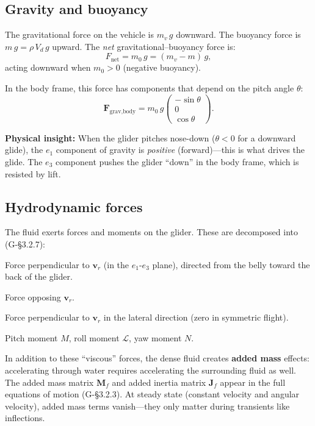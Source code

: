 \documentclass[11pt,a4paper]{article}
\newcommand{\vect}[1]{\bm{#1}}
\newcommand{\mat}[1]{\mathbf{#1}}
\newcommand{\insight}[1]{\par\smallskip\noindent\colorbox{green!8}{\parbox{\dimexpr\linewidth-2\fboxsep}{%
  \small\textbf{Physical insight:} #1}}\smallskip}
\begin{document}
\subsection{Gravity and buoyancy}

The gravitational force on the vehicle is $m_v\,g$ downward.  The buoyancy force is
$m\,g = \rho\,V_d\,g$ upward.  The \emph{net} gravitational--buoyancy force is:
\begin{equation}
  F_\text{net} = m_0\,g = (m_v - m)\,g,
  \label{eq:Fnet}
\end{equation}
acting downward when $m_0>0$ (negative buoyancy).

In the body frame, this force has components that depend on the pitch angle $\theta$:
\begin{equation}
  \vect{F}_\text{grav,body} = m_0\,g\begin{pmatrix} -\sin\theta \\ 0 \\ \cos\theta \end{pmatrix}.
  \label{eq:Fgrav_body}
\end{equation}

\insight{When the glider pitches nose-down ($\theta<0$ for a downward glide), the
$e_1$ component of gravity is \emph{positive} (forward)---this is what drives the glide.
The $e_3$ component pushes the glider ``down'' in the body frame, which is resisted by lift.}

\subsection{Hydrodynamic forces}

The fluid exerts forces and moments on the glider.  These are decomposed into
(G-\S3.2.7):

\begin{description}[nosep]
  \item[Lift $L$:] Force perpendicular to $\vect{v}_r$ (in the $e_1$-$e_3$ plane),
    directed from the belly toward the back of the glider.
  \item[Drag $D$:] Force opposing $\vect{v}_r$.
  \item[Side force $SF$:] Force perpendicular to $\vect{v}_r$ in the lateral direction
    (zero in symmetric flight).
  \item[Moments:] Pitch moment $M$, roll moment $\mathcal{L}$, yaw moment $N$.
\end{description}

In addition to these ``viscous'' forces, the dense fluid creates \textbf{added mass}
effects: accelerating through water requires accelerating the surrounding fluid as well.
The added mass matrix $\mat{M}_f$ and added inertia matrix $\mat{J}_f$ appear in the
full equations of motion (G-\S3.2.3).  At steady state (constant velocity and angular
velocity), added mass terms vanish---they only matter during transients like inflections.
\end{document}
